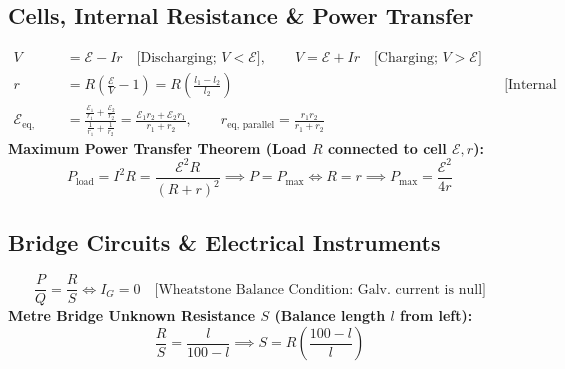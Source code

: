 \documentclass[11pt,a4paper]{article}
\begin{document}
\subsection{Cells, Internal Resistance \& Power Transfer}

\begin{formulabox}
\begin{align}
  V &= \mathcal{E} - Ir \quad \text{[Discharging; } V < \mathcal{E}\text{]}, \qquad V = \mathcal{E} + Ir \quad \text{[Charging; } V > \mathcal{E}\text{]} \\
  r &= R\left(\frac{\mathcal{E}}{V} - 1\right) = R\left(\frac{l_1 - l_2}{l_2}\right) && \text{[Internal Resistance Formulation]} \\
  \mathcal{E}_{\text{eq, parallel}} &= \frac{\frac{\mathcal{E}_1}{r_1} + \frac{\mathcal{E}_2}{r_2}}{\frac{1}{r_1} + \frac{1}{r_2}} = \frac{\mathcal{E}_1 r_2 + \mathcal{E}_2 r_1}{r_1 + r_2}, \qquad r_{\text{eq, parallel}} = \frac{r_1 r_2}{r_1 + r_2}
\end{align}
\textbf{Maximum Power Transfer Theorem (Load $R$ connected to cell $\mathcal{E}, r$):}
\begin{equation}
  P_{\text{load}} = I^2 R = \frac{\mathcal{E}^2 R}{(R + r)^2} \implies P = P_{\max} \iff R = r \implies P_{\max} = \frac{\mathcal{E}^2}{4r}
\end{equation}
\end{formulabox}

\subsection{Bridge Circuits \& Electrical Instruments}

\begin{formulabox}
\begin{equation}
  \frac{P}{Q} = \frac{R}{S} \iff I_G = 0 \quad \text{[Wheatstone Balance Condition: Galv. current is null]}
\end{equation}
\textbf{Metre Bridge Unknown Resistance $S$ (Balance length $l$ from left):}
\begin{equation}
  \frac{R}{S} = \frac{l}{100 - l} \implies S = R\left(\frac{100 - l}{l}\right)
\end{equation}
\end{formulabox}
\end{document}
